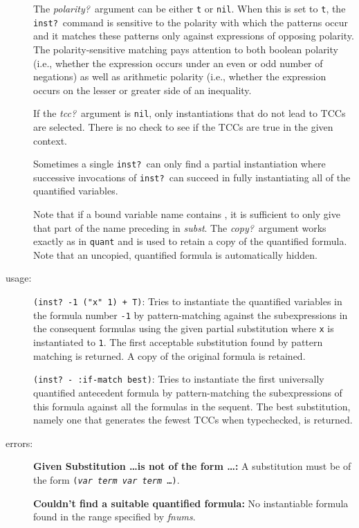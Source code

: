 \documentclass[12pt,twoside]{book}
\makeatletter
\newcommand{\indtt}[1]{\texttt{#1}\index{#1@{\texttt{#1}}}}  %
\makeatother
\begin{document}
\begin{description}
The \emph{polarity?}\ argument can be either \texttt{t} or \texttt{nil}\@.
When this is set to \texttt{t}, the \texttt{inst?}\ command is sensitive
to the polarity with which the patterns occur and it matches these
patterns only against expressions of opposing polarity.  The
polarity-sensitive matching pays attention to both boolean polarity (i.e.,
whether the expression occurs under an even or odd number of negations) as
well as arithmetic polarity (i.e., whether the expression occurs on the
lesser or greater side of an inequality.

If the \emph{tcc?}\ argument is \texttt{nil}, only instantiations that do
not lead to TCCs are selected.  There is no check to see if the TCCs are
true in the given context.

Sometimes a single \indtt{inst?}\ can only find a partial
instantiation where successive invocations of \indtt{inst?}\ 
can succeed in fully instantiating all of the quantified variables.

Note that if a bound variable name contains \texttt{}, it is
sufficient to only give that part of the name preceding \texttt{} in \emph{subst}.  The \emph{copy?}\ argument works exactly as in \indtt{quant} and
is used to retain a copy of the quantified formula.  Note that an
uncopied, quantified formula is automatically hidden.

\item[usage: ] \texttt{(inst?\ -1 ("x" 1) + T)}: Tries to instantiate the
quantified variables in the formula number \texttt{-1} by pattern-matching
against the subexpressions in the consequent formulas using
the given partial substitution where \texttt{x} is instantiated to \texttt{1}.
The first acceptable substitution found by pattern matching is returned.
A copy of the original formula is retained.

\texttt{(inst?\ - :if-match best)}: Tries to instantiate the first universally
quantified antecedent formula by pattern-matching the subexpressions
of this formula against all the formulas in the sequent.  
The best substitution, namely one that generates the fewest TCCs when
typechecked, is returned.

\item[errors: ] {\bf Given Substitution \ldots is not of the form \ldots:}
A substitution 
must be of the form \texttt{(\emph{var} \emph{term} \emph{var} \emph{term} \ldots)}.

{\bf Couldn't find a suitable quantified formula:}  No instantiable
formula found in the range specified by \emph{fnums}.


\end{description}
\end{document}
